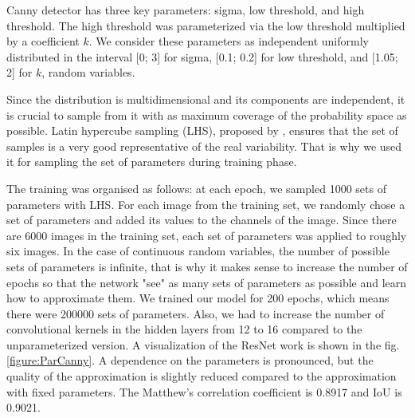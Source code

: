 
Canny detector has three key parameters: sigma, low threshold, and high threshold. The high threshold was parameterized via the low threshold multiplied by a coefficient $k$. We consider these parameters as independent uniformly distributed in the interval [0; 3] for sigma, [0.1; 0.2] for low threshold, and [1.05; 2] for $k$, random variables.

Since the distribution is multidimensional and its components are independent, it is crucial to sample from it with as maximum coverage of the probability space as possible. Latin hypercube sampling (LHS), proposed by \cite{LHS}, ensures that the set of samples is a very good representative of the real variability. That is why we used it for sampling the set of parameters during training phase. 

The training was organised as follows: at each epoch, we sampled 1000 sets of parameters with LHS. For each image from the training set, we randomly chose a set of parameters and added its values to the channels of the image. Since there are 6000 images in the training set, each set of parameters was applied to roughly six images. In the case of continuous random variables, the number of possible sets of parameters is infinite, that is why it makes sense to increase the number of epochs so that the network "see" as many sets of parameters as possible and learn how to approximate them. We trained our model for 200 epochs, which means there were 200000 sets of parameters. Also, we had to increase the number of convolutional kernels in the hidden layers from 12 to 16 compared to the unparameterized version. A visualization of the ResNet work is shown in the fig. \ref{figure:ParCanny}. A dependence on the parameters is pronounced, but the quality of the approximation is slightly reduced compared to the approximation with fixed parameters. The Matthew's correlation coefficient is 0.8917 and IoU is 0.9021. 

